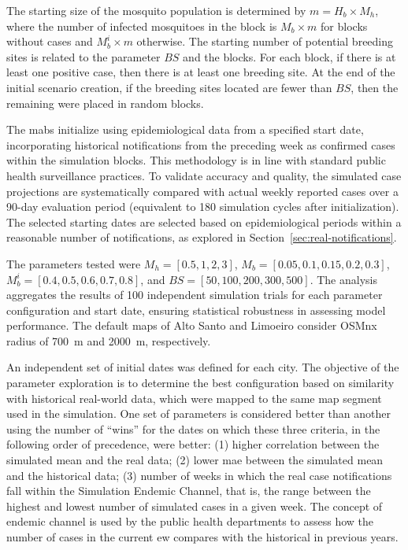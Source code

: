 The starting size of the mosquito population is determined by $m = H_b \times M_h$, where the number of infected mosquitoes in the block is $M_b \times m$ for blocks without cases and $M_b^{i} \times m$ otherwise. The starting number of potential breeding sites is related to the parameter $BS$ and the blocks. For each block, if there is at least one positive case, then there is at least one breeding site. At the end of the initial scenario creation, if the breeding sites located are fewer than $BS$, then the remaining were placed in random blocks. 

The \gls{mabs} initialize using epidemiological data from a specified start date, incorporating historical notifications from the preceding week as confirmed cases within the simulation blocks.
This methodology is in line with standard public health surveillance practices. 
To validate accuracy and quality, the simulated case projections are systematically compared with actual weekly reported cases over a 90-day evaluation period (equivalent to 180 simulation cycles after initialization). The selected starting dates are selected based on epidemiological periods within a reasonable number of notifications, as explored in Section~\ref{sec:real-notifications}.

The parameters tested were $M_h = [0.5, 1, 2, 3]$, $M_b = [0.05, 0.1, 0.15, 0.2, 0.3]$, $M_b^{i} = [0.4, 0.5, 0.6, 0.7, 0.8]$, and $BS = [50, 100, 200, 300, 500]$. The analysis aggregates the results of 100 independent simulation trials for each parameter configuration and start date, ensuring statistical robustness in assessing model performance. The default maps of Alto Santo and Limoeiro consider OSMnx radius of 700~m and 2000~m, respectively. 

An independent set of initial dates was defined for each city. 
The objective of the parameter exploration is to determine the best configuration based on similarity with historical real-world data, which were mapped to the same map segment used in the simulation. 
One set of parameters is considered better than another using the number of ``wins'' for the dates on which these three criteria, in the following order of precedence, were better: (1) higher correlation between the simulated mean and the real data; (2) lower \gls{mae} between the simulated mean and the historical data; (3) number of weeks in which the real case notifications fall within the Simulation Endemic Channel, that is, the range between the highest and lowest number of simulated cases in a given week. The concept of endemic channel is used by the public health departments to assess how the number of cases in the current \gls{ew} compares with the historical in previous years. 

